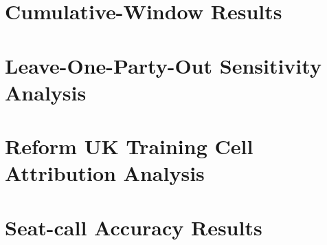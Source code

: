\documentclass[final-report]{report-template}
\begin{document}
\clearpage
\section{Cumulative-Window Results}

\begin{table}[htbp]
  \centering
  
  \caption{Cumulative-window results for all 18 comparisons(three news arms: local, national and combined across six non-overlapping windows). $\Delta$MAE is measured relative to the v2 no-news control MAE of 4.4454, with positive values indicating lower error with news. The Reform UK column reports the corresponding $\Delta$MAE for Reform UK candidates only.}
  \label{tab:a12-cumulative}
\end{table}


\section{Leave-One-Party-Out Sensitivity Analysis}

\begin{table}[htbp]
  \centering\small
  
  \caption{Leave-one-party-out sensitivity analysis. The table reports the number of MAE improvements across the 18 comparisons(three news arms: local, national and combined across six non-overlapping windows) when each party is removed from the training sample.}
  \label{tab:a17-lopo}
\end{table}

\clearpage
\section{Reform UK Training Cell Attribution Analysis}

\begin{table}[htbp]
  \centering
  \small
  
  \caption{Post-evaluation exploratory attribution of $\Delta$MAE to Reform UK training cells. The table compares the full-fit model with 45 training cells, including seven Reform UK cells, against a no-Reform specification with 38 cells across combined and national news settings and prediction windows. The difference between specifications represents the contribution of the Reform UK training cells. Positive $\Delta$MAE values indicate that news reduced prediction error.}
  \label{tab:a18-reform-attribution}
\end{table}

\clearpage
\section{Seat-call Accuracy Results}
\begin{table}[htbp] 
\centering\small 
 
\caption{Seat-call accuracy for each v2 specification and its difference from the non-news adjustment control. The final column shows whether each specification exceeded the 0.8053 elect-nobody benchmark; seat-call accuracy remained a secondary outcome and was not promoted to a confirmatory finding.} 
\label{tab:a4}
\end{table}
\end{document}
